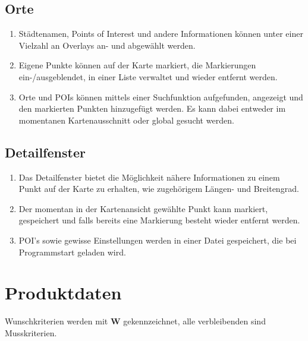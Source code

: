 \documentclass[10pt]{scrreprt}
\newcommand{\sfbf}[1]{\textbf{\sffamily #1}}
\newcommand{\W}{\sfbf{W}}
\newcommand{\ziel}[1]{{\fontsize{9.5}{11}\textsf{/#1/}}}
\newcommand{\ziellabel}{Z}
\newcommand{\muss}{\renewcommand{\labelenumi}{\textbf{\ziel{\ziellabel\numprint{\theenumi}0}}}}
\newcommand{\wunsch}{\renewcommand{\labelenumi}{\textbf{\ziel{\ziellabel\numprint{\theenumi}0W}}}}
\begin{document}
\section{Orte}
\begin{enumerate}[leftmargin=2.2cm,resume]
\item Städtenamen, Points of Interest und andere Informationen können unter einer Vielzahl an Overlays an- und abgewählt werden.
\wunsch
\item Eigene Punkte können auf der Karte markiert, die Markierungen ein-/ausgeblendet, in einer Liste verwaltet und wieder entfernt werden. 
\item Orte und POIs können mittels einer Suchfunktion aufgefunden, angezeigt und den markierten Punkten hinzugefügt werden. Es kann dabei entweder im momentanen Kartenausschnitt oder global gesucht werden.
\end{enumerate}

\section{Detailfenster}
\begin{enumerate}[leftmargin=2.2cm,resume]
\item Das Detailfenster bietet die Möglichkeit nähere Informationen zu einem Punkt auf der Karte zu erhalten, wie zugehörigem Längen- und Breitengrad.
\wunsch
\item Der momentan in der Kartenansicht gewählte Punkt kann markiert,  gespeichert und falls bereits eine Markierung besteht wieder entfernt werden.
\item POI's sowie gewisse Einstellungen werden in einer Datei gespeichert, die bei Programmstart geladen wird.
\end{enumerate}



\chapter{Produktdaten}

\renewcommand{\ziellabel}{D}
\muss

Wunschkriterien werden mit {\W } gekennzeichnet, alle verbleibenden sind Musskriterien.\\

\vspace{5mm}
\end{document}
